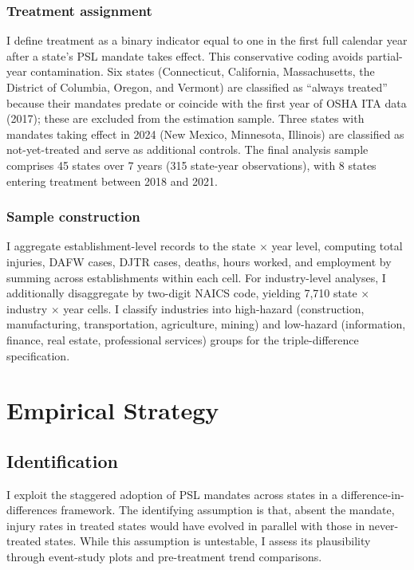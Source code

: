 \documentclass[12pt]{article}
\begin{document}
\subsubsection*{Treatment assignment} I define treatment as a binary indicator equal to one in the first full calendar year after a state's PSL mandate takes effect. This conservative coding avoids partial-year contamination. Six states (Connecticut, California, Massachusetts, the District of Columbia, Oregon, and Vermont) are classified as ``always treated'' because their mandates predate or coincide with the first year of OSHA ITA data (2017); these are excluded from the estimation sample. Three states with mandates taking effect in 2024 (New Mexico, Minnesota, Illinois) are classified as not-yet-treated and serve as additional controls. The final analysis sample comprises 45 states over 7 years (315 state-year observations), with 8 states entering treatment between 2018 and 2021.

\subsubsection*{Sample construction} I aggregate establishment-level records to the state $\times$ year level, computing total injuries, DAFW cases, DJTR cases, deaths, hours worked, and employment by summing across establishments within each cell. For industry-level analyses, I additionally disaggregate by two-digit NAICS code, yielding 7,710 state $\times$ industry $\times$ year cells. I classify industries into high-hazard (construction, manufacturing, transportation, agriculture, mining) and low-hazard (information, finance, real estate, professional services) groups for the triple-difference specification.




\section{Empirical Strategy}

\subsection{Identification}

I exploit the staggered adoption of PSL mandates across states in a difference-in-differences framework. The identifying assumption is that, absent the mandate, injury rates in treated states would have evolved in parallel with those in never-treated states. While this assumption is untestable, I assess its plausibility through event-study plots and pre-treatment trend comparisons.
\end{document}

